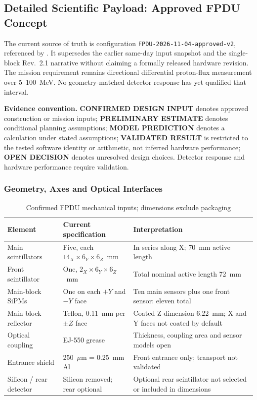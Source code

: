 \subsection{Detailed Scientific Payload: Approved FPDU Concept}\label{app:payload-detail}
The current source of truth is configuration \texttt{FPDU-2026-11-04-approved-v2}, referenced by . It supersedes the earlier same-day input snapshot and the single-block Rev.~2.1 narrative without claiming a formally released hardware revision. The mission requirement remains directional differential proton-flux measurement over 5--100~MeV. No geometry-matched detector response has yet qualified that interval.

\textbf{Evidence convention.} \textbf{CONFIRMED DESIGN INPUT} denotes approved construction or mission inputs; \textbf{PRELIMINARY ESTIMATE} denotes conditional planning assumptions; \textbf{MODEL PREDICTION} denotes a calculation under stated assumptions; \textbf{VALIDATED RESULT} is restricted to the tested software identity or arithmetic, not inferred hardware performance; \textbf{OPEN DECISION} denotes unresolved design choices. Detector response and hardware performance require validation.

\subsubsection{Geometry, Axes and Optical Interfaces}\label{app:payload-configuration}
\begin{table}[H]\centering\small
\caption{Confirmed FPDU mechanical inputs; dimensions exclude packaging}\label{tab:fpdu-design-summary}
\begin{tabularx}{\linewidth}{@{}p{3.1cm}p{4.1cm}X@{}}\toprule
Element & Current specification & Interpretation\\\midrule
Main scintillators & Five, each $14_X\times6_Y\times6_Z$~mm & In series along X; 70~mm active length\\
Front scintillator & One, $2_X\times6_Y\times6_Z$~mm & Total nominal active length 72~mm\\
Main-block SiPMs & One on each $+Y$ and $-Y$ face & Ten main sensors plus one front sensor: eleven total\\
Main-block reflector & Teflon, 0.11~mm per $\pm Z$ face & Coated Z dimension 6.22~mm; X and Y faces not coated by default\\
Optical coupling & EJ-550 grease & Thickness, coupling area and sensor models open\\
Entrance shield & 250~$\mu$m = 0.25~mm Al & Front entrance only; transport not validated\\
Silicon / rear detector & Silicon removed; rear optional & Optional rear scintillator not selected or included in dimensions\\\bottomrule
\end{tabularx}\end{table}

